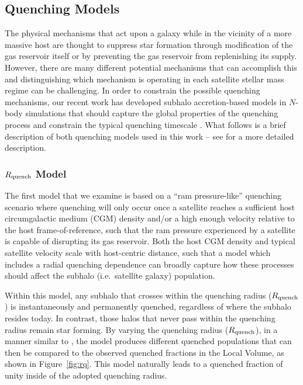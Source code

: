 


\subsection{Quenching Models}
\label{subsec:models}

The physical mechanisms that act upon a galaxy while in the vicinity
of a more massive host are thought to suppress star formation through
modification of the gas reservoir itself or by preventing the gas
reservoir from replenishing its supply. 
%
However, there are many different potential mechanisms that can
accomplish this and distinguishing which mechanism is operating in
each satellite stellar mass regime can be challenging.
%
In order to constrain the possible quenching mechanisms, our recent work has
developed subhalo accretion-based models in $N$-body simulations that
should capture the global properties of the quenching process
and constrain the typical quenching timescale \citep{fham15, wheeler14}.
%
What follows is a brief description of both quenching models used in
this work -- see \citet{fham15} for a more detailed description.
%



\subsubsection{$R_{\rm quench}$ Model}
\label{subsubsec:rps}

The first model that we examine is based on a ``ram pressure-like'' quenching
scenario where quenching will only occur once a satellite reaches a sufficient
host circumgalactic medium (CGM) density and/or a high enough velocity relative
to the host frame-of-reference, such that the ram pressure experienced by a
satellite is capable of disrupting its gas reservoir.
%
Both the host CGM density and typical satellite velocity scale with host-centric
distance, such that a model which includes a radial quenching dependence can
broadly capture how these processes should affect the subhalo (i.e.~satellite
galaxy) population.
%




Within this model, any subhalo that crosses within the quenching radius
($R_{\rm quench}$) is instantaneously and permanently quenched, regardless of
where the subhalo resides today.
%
In contrast, those halos that never pass within the quenching radius remain
star forming.
%
By varying the quenching radius ($R_{\rm quench}$), in a manner similar to
\citet{fham15}, the model produces different quenched populations that can then
be compared to the observed quenched fractions in the Local Volume, as shown in
Figure~\ref{fig:rq}.
%
This model naturally leads to a quenched fraction of unity inside of the adopted
quenching radius.
%




